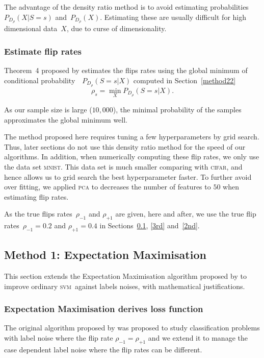 \documentclass[12pt]{article} %
\newcommand{\svm}{\textsc{svm}}
\newcommand{\rhoo}{\rho_{+1}}
\newcommand{\rhoz}{\rho_{-1}}
\begin{document}
The advantage of the density ratio method is to avoid estimating probabilities~${P_{D_\rho}(X|S=s)}$ and~${P_{D_\rho}(X)}$. Estimating these are usually difficult for high dimensional data~$X$, due to curse of dimensionality.


\subsubsection{Estimate flip rates}\label{method23}
Theorem~4 proposed by \citet{liu2016classification} estimates the flips rates using the global minimum of conditional probability~~$P_{D_\rho}(S=s|X)$ computed in Section~\ref{method22}
\begin{equation*}\label{eq:fliprate}
\rho_s=\min _X P_{D_\rho}(S=s|X).
\end{equation*}

As our sample size is large ($10,000$), the minimal probability of the samples approximates the global minimum well.

The method proposed here requires tuning a few hyperparameters by grid search. Thus, later sections do not use this density ratio method for the speed of our algorithms.
In addition, when numerically computing these flip rates, we only use the data set \textsc{mnist}. This data set is much smaller comparing with \textsc{cifar}, and hence allows us to grid search the best hyperparameter faster. To further avoid over fitting, we applied \textsc{pca} to decreases the number of features to $50$ when estimating flip rates.

As the true flips rates~$\rhoz$ and $\rhoo$ are given, here and after, we use the true flip rates~$\rhoz=0.2$ and $\rhoo=0.4$ in Sections~\ref{1st}, \ref{3rd} and~\ref{2nd}.


\subsection{Method 1: Expectation Maximisation}\label{1st}
This section extends the Expectation Maximisation algorithm proposed by \citet{pmlr-v20-biggio11} to improve ordinary \svm\ against labels noises, with mathematical justifications.
\subsubsection{Expectation Maximisation derives loss function}
The original algorithm proposed by \citet{pmlr-v20-biggio11} was proposed to study classification problems with label noise where the flip rate $\rhoz=\rhoo$ and we extend it to manage the case dependent label noise where the flip rates can be different.
\end{document}
